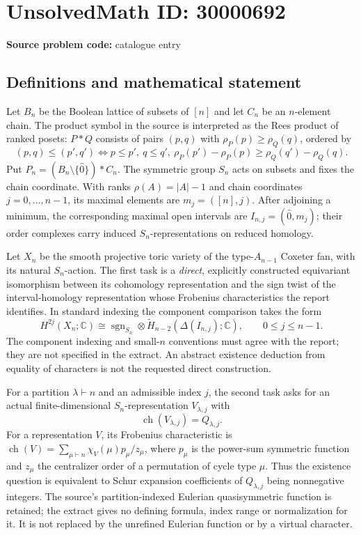 \documentclass[11pt]{article}
\newcommand{\C}{\mathbb{C}}
\begin{document}
\section*{UnsolvedMath ID: 30000692}
\textbf{Source problem code:} catalogue entry
\subsection{Definitions and mathematical statement}
Let $B_n$ be the Boolean lattice of subsets of $[n]$ and let $C_n$ be an $n$-element chain. The product symbol in the source is interpreted as the Rees product of ranked posets: $P*Q$ consists of pairs $(p,q)$ with $\rho_P(p)\geq\rho_Q(q)$, ordered by
\[
(p,q)\leq(p',q')\iff p\leq p',\ q\leq q',\
\rho_P(p')-\rho_P(p)\geq\rho_Q(q')-\rho_Q(q).
\]
Put $P_n=(B_n\setminus\{\widehat0\})*C_n$. The symmetric group $S_n$ acts on subsets and fixes the chain coordinate. With ranks $\rho(A)=|A|-1$ and chain coordinates $j=0,\ldots,n-1$, its maximal elements are $m_j=([n],j)$. After adjoining a minimum, the corresponding maximal open intervals are $I_{n,j}=(\widehat0,m_j)$; their order complexes carry induced $S_n$-representations on reduced homology.

Let $X_n$ be the smooth projective toric variety of the type-$A_{n-1}$ Coxeter fan, with its natural $S_n$-action. The first task is a \emph{direct}, explicitly constructed equivariant isomorphism between its cohomology representation and the sign twist of the interval-homology representation whose Frobenius characteristics the report identifies. In standard indexing the component comparison takes the form
\[
H^{2j}(X_n;\C)\cong
\operatorname{sgn}_{S_n}\otimes
\widetilde H_{n-2}(\Delta(I_{n,j});\C),
\qquad0\leq j\leq n-1.
\]
The component indexing and small-$n$ conventions must agree with the report; they are not specified in the extract. An abstract existence deduction from equality of characters is not the requested direct construction.

For a partition $\lambda\vdash n$ and an admissible index $j$, the second task asks for an actual finite-dimensional $S_n$-representation $V_{\lambda,j}$ with
\[
\operatorname{ch}(V_{\lambda,j})=Q_{\lambda,j}.
\]
For a representation $V$, its Frobenius characteristic is $\operatorname{ch}(V)=\sum_{\mu\vdash n}\chi_V(\mu)p_\mu/z_\mu$, where $p_\mu$ is the power-sum symmetric function and $z_\mu$ the centralizer order of a permutation of cycle type $\mu$. Thus the existence question is equivalent to Schur expansion coefficients of $Q_{\lambda,j}$ being nonnegative integers. The source's partition-indexed Eulerian quasisymmetric function is retained; the extract gives no defining formula, index range or normalization for it. It is not replaced by the unrefined Eulerian function or by a virtual character.
\end{document}
